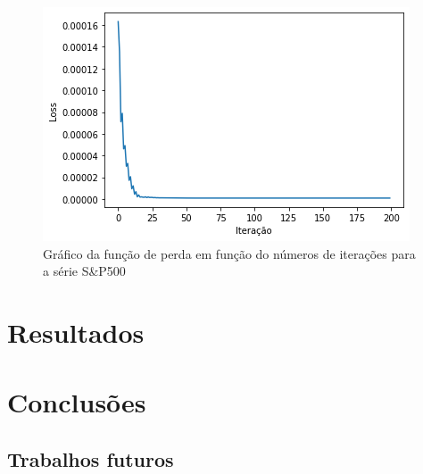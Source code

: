 \documentclass[
    12pt,
    oneside,
    a4paper,
    english,
    brazil
]{abntex2}
\begin{document}
\begin{figure}[ht]
    \centering
    \caption{Gráfico da função de perda em  função do números de iterações para
    a série S\&P500}\label{fig:iter_sp500_overfit}
    \includegraphics[width=.5\linewidth]{images/sp500_overfit_iter.png}
\end{figure}

\chapter{Resultados}\label{chap:result}

\chapter{Conclusões}\label{chap:concl}

\section{Trabalhos futuros}

\postextual


\end{document}
